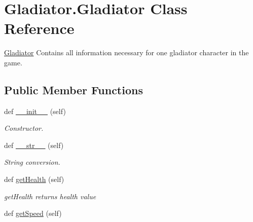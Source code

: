 \hypertarget{classGladiator_1_1Gladiator}{}\section{Gladiator.\+Gladiator Class Reference}
\label{classGladiator_1_1Gladiator}


\hyperlink{classGladiator_1_1Gladiator}{Gladiator} Contains all information necessary for one gladiator character in the game.  


\subsection*{Public Member Functions}
\begin{DoxyCompactItemize}
\item 
\hypertarget{classGladiator_1_1Gladiator_a97bc7846e556803d8aef6bf6db293927}{}def \hyperlink{classGladiator_1_1Gladiator_a97bc7846e556803d8aef6bf6db293927}{\+\_\+\+\_\+init\+\_\+\+\_\+} (self)\label{classGladiator_1_1Gladiator_a97bc7846e556803d8aef6bf6db293927}

\begin{DoxyCompactList}\small\item\em Constructor. \end{DoxyCompactList}\item 
\hypertarget{classGladiator_1_1Gladiator_a75f206f4758b41b32da82713f3a7bf23}{}def \hyperlink{classGladiator_1_1Gladiator_a75f206f4758b41b32da82713f3a7bf23}{\+\_\+\+\_\+str\+\_\+\+\_\+} (self)\label{classGladiator_1_1Gladiator_a75f206f4758b41b32da82713f3a7bf23}

\begin{DoxyCompactList}\small\item\em String conversion. \end{DoxyCompactList}\item 
\hypertarget{classGladiator_1_1Gladiator_ac7b5a72c5527beb571f029d9b60ad7bb}{}def \hyperlink{classGladiator_1_1Gladiator_ac7b5a72c5527beb571f029d9b60ad7bb}{get\+Health} (self)\label{classGladiator_1_1Gladiator_ac7b5a72c5527beb571f029d9b60ad7bb}

\begin{DoxyCompactList}\small\item\em get\+Health returns health value \end{DoxyCompactList}\item 
\hypertarget{classGladiator_1_1Gladiator_ab61a5131b61ba8467c578efac0123d3c}{}def \hyperlink{classGladiator_1_1Gladiator_ab61a5131b61ba8467c578efac0123d3c}{get\+Speed} (self)\label{classGladiator_1_1Gladiator_ab61a5131b61ba8467c578efac0123d3c}


\end{DoxyCompactItemize}
